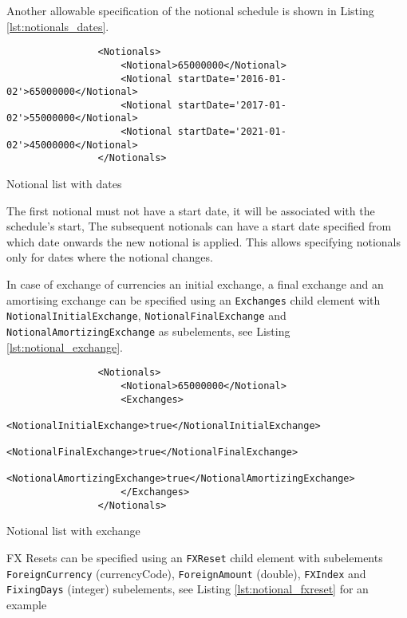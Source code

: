 \begin{itemize}
Another allowable specification of the notional schedule is shown in Listing \ref{lst:notionals_dates}. 
\begin{listing}[H]
\begin{verbatim}
                <Notionals>
                    <Notional>65000000</Notional>
                    <Notional startDate='2016-01-02'>65000000</Notional>
                    <Notional startDate='2017-01-02'>55000000</Notional>
                    <Notional startDate='2021-01-02'>45000000</Notional>
                </Notionals>
\end{verbatim}
\caption{Notional list with dates}
\label{lst:notionals_dates}
\end{listing}
The first notional must not have a start date, it will be associated
with the schedule's start, The subsequent notionals can have a start
date specified from which date onwards the new notional is applied. This allows
specifying notionals only for dates where the notional changes. 

\vspace{1em} 

In case of exchange of currencies an initial exchange, a final exchange
and an amortising exchange can be specified using an \lstinline!Exchanges! child element with \break
\lstinline!NotionalInitialExchange!, \lstinline!NotionalFinalExchange! and \break
\lstinline!NotionalAmortizingExchange! as subelements, see Listing
\ref{lst:notional_exchange}.

\begin{listing}[H]
\begin{verbatim}
                <Notionals>
                    <Notional>65000000</Notional>
                    <Exchanges>
                      <NotionalInitialExchange>true</NotionalInitialExchange>
                      <NotionalFinalExchange>true</NotionalFinalExchange>
                      <NotionalAmortizingExchange>true</NotionalAmortizingExchange>
                    </Exchanges>
                </Notionals>
\end{verbatim}
\caption{Notional list with exchange}
\label{lst:notional_exchange}
\end{listing}

FX Resets can be specified using an \lstinline!FXReset! child element with subelements \break
\lstinline!ForeignCurrency! (currencyCode), \lstinline!ForeignAmount! (double), \lstinline!FXIndex! and \break
\lstinline!FixingDays! (integer) subelements, see Listing
\ref{lst:notional_fxreset} for an example


\end{itemize}
